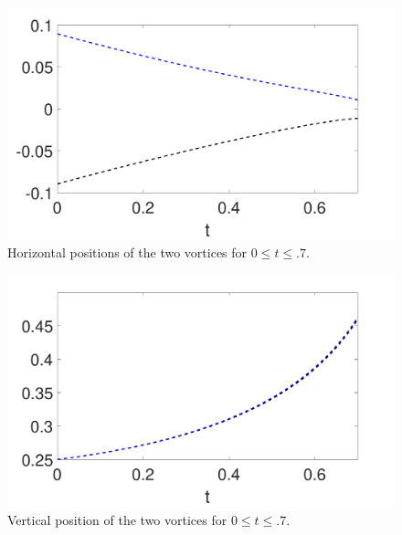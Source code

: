 \documentclass[a4paper,11pt]{article}
\begin{document}
\begin{figure}[!h]
\centering
\includegraphics[width=.75\textwidth]{xtrack_mu_pt2_F_1_tf_pt7}
\caption{Horizontal positions of the two vortices for $0\leq t \leq .7$.}
\end{figure}
\begin{figure}[!h]
\centering
\includegraphics[width=.75\textwidth]{ztrack_mu_pt2_F_1_tf_pt7}
\caption{Vertical position of the two vortices for $0\leq t \leq .7$.}
\end{figure}
\end{document}
